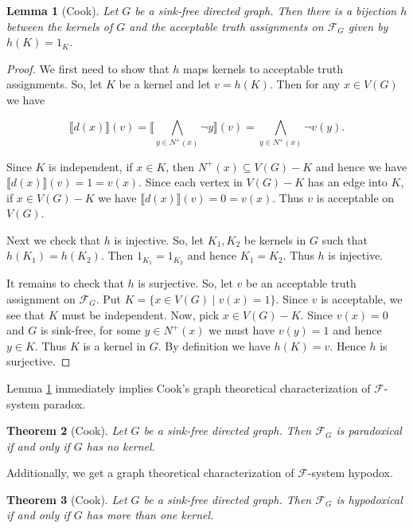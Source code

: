 \documentclass[12pt]{kluwer}
\newtheorem{thm}{Theorem}
\newtheorem{lem}[thm]{Lemma}
\theoremstyle{remark}
\newcommand{\fancy}[1]{\mathcal{#1}}
\def\F{\fancy{F}}
\def\F{\fancy{F}}
\begin{document}
\begin{lem}[Cook]\label{KernelBijection}
Let $G$ be a sink-free directed graph.  Then there is a bijection $h$ between the kernels of $G$ and the acceptable truth assignments on $\F_G$ given by $h(K) = 1_K$.
\end{lem}
\begin{proof}
We first need to show that $h$ maps kernels to acceptable truth assignments.  So, let $K$ be a kernel and let $v = h(K)$.  Then for any $x \in V(G)$ we have

\[\llbracket d(x) \rrbracket(v) = \llbracket \bigwedge_{y \in N^+(x)} \neg y \rrbracket(v) = \bigwedge_{y \in N^+(x)} \neg v(y).\]

Since $K$ is independent, if $x \in K$, then $N^+(x) \subseteq V(G) - K$ and hence we have $\llbracket d(x) \rrbracket(v) = 1 = v(x)$.  Since each vertex in $V(G) - K$ has an edge into $K$, if $x \in V(G) - K$ we have $\llbracket d(x) \rrbracket(v) = 0 = v(x)$.  Thus $v$ is acceptable on $V(G)$.\newline

Next we check that $h$ is injective.  So, let $K_1, K_2$ be kernels in $G$ such that $h(K_1) = h(K_2)$.  Then $1_{K_1} = 1_{K_2}$ and hence $K_1 = K_2$.  Thus $h$ is injective.\newline

It remains to check that $h$ is surjective.  So, let $v$ be an acceptable truth assignment on $\F_G$.  Put $K = \{x \in V(G) \mid v(x) = 1\}$.  Since $v$ is acceptable, we see that $K$ must be independent.  Now, pick $x \in V(G) - K$.  Since $v(x) = 0$ and $G$ is sink-free, for some $y \in N^+(x)$ we must have $v(y) = 1$ and hence $y \in K$.  Thus $K$ is a kernel in $G$.  By definition we have $h(K) = v$.  Hence $h$ is surjective.\newline
\end{proof}

Lemma \ref{KernelBijection} immediately implies Cook's graph theoretical characterization of $\F$-system paradox.
\begin{thm}[Cook]
Let $G$ be a sink-free directed graph. Then $\F_G$ is paradoxical if and only if $G$ has no kernel.
\end{thm}

Additionally, we get a graph theoretical characterization of $\F$-system hypodox.
\begin{thm}[Cook]
Let $G$ be a sink-free directed graph. Then $\F_G$ is hypodoxical if and only if $G$ has more than one kernel.
\end{thm}
\end{document}
